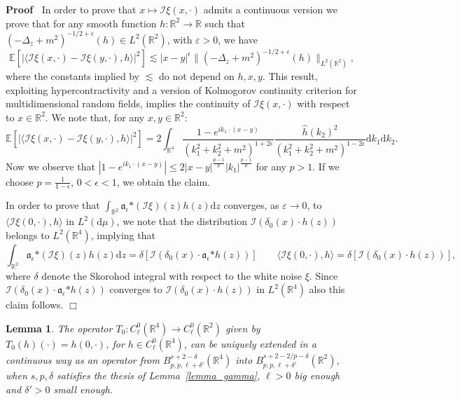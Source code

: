 \documentclass[a4paper,10pt]{article}
\newcommand{\asterisk}{\mathord{*}}
\newcommand{\mathd}{\mathrm{d}}
\newenvironment{proof}{\noindent\textbf{Proof\ }}{\hspace*{\fill}$\Box$\medskip}
\newtheorem{lemma}[theorem]{Lemma}
\begin{document}
\begin{proof}
  In order to prove that $x \longmapsto \mathcal{I} \xi (x, \cdot)$ admits a
  continuous version we prove that for any smooth function $h : \mathbb{R}^2
  \rightarrow \mathbb{R}$ such that $(- \Delta_z + m^2)^{- 1 / 2 + \epsilon}
  (h) \in L^2 (\mathbb{R}^2)$, with $\varepsilon > 0$, we have
  \[ \mathbb{E} [| \langle \mathcal{I} \xi (x, \cdot) - \mathcal{I} \xi (y,
     \cdot), h \rangle |^2] \lesssim | x - y |^{\epsilon} \| (- \Delta_z +
     m^2)^{- 1 / 2 + \epsilon} (h) \|_{L^2 (\mathbb{R}^2)}, \]
  where the constants implied by $\lesssim$ do not depend on $h, x, y$. This
  result, exploiting hypercontractivity and a version of Kolmogorov continuity
  criterion for multidimensional random fields, implies the continuity of
  $\mathcal{I} \xi (x, \cdot)$ with respect to $x \in \mathbb{R}^2$. We note
  that, for any $x, y \in \mathbb{R}^2$:
  \[ \mathbb{E} [| \langle \mathcal{I} \xi (x, \cdot) - \mathcal{I} \xi (y,
     \cdot), h \rangle |^2] = 2 \int_{\mathbb{R}^4} \frac{1 - e^{i k_1 \cdot
     (x - y)}}{(k_1^2 + k_2^2 + m^2)^{1 + 2 \epsilon}} \frac{\hat{h}
     (k_2)^2}{(k_1^2 + k_2^2 + m^2)^{1 - 2 \epsilon}} \mathd k_1 \mathd k_2 .
  \]
  Now we observe that $| 1 - e^{i k_1 \cdot (x - y)} | \leqslant 2 | x - y
  |^{\frac{p - 1}{p}} | k_1 |^{\frac{p - 1}{p}}$ for any $p > 1$. If we choose
  $p = \frac{1}{1 - \epsilon}$, $0 < \epsilon < 1$, we obtain the claim.
  
  In order to prove that $\int_{\mathbb{R}^2} \mathfrak{a}_{\epsilon}
  \asterisk (\mathcal{I} \xi) (z) h (z) \mathd z$ converges, as $\varepsilon
  \rightarrow 0$, to $\langle \mathcal{I} \xi (0, \cdot), h \rangle$ in $L^2
  (\mathd \mu)$, we note that the distribution $\mathcal{I} (\delta_0 (x)
  \cdot h (z))$ belongs to $L^2 (\mathbb{R}^4)$, implying that
  \[ \int_{\mathbb{R}^2} \mathfrak{a}_{\epsilon} \asterisk (\mathcal{I} \xi)
     (z) h (z) \mathd z = \delta [\mathcal{I} (\delta_0 (x) \cdot
     \mathfrak{a}_{\epsilon} \asterisk h (z))] \qquad \langle \mathcal{I} \xi
     (0, \cdot), h \rangle = \delta [\mathcal{I} (\delta_0 (x) \cdot h (z))],
  \]
  where $\delta$ denote the Skorohod integral with respect to the white noise
  $\xi$. Since $\mathcal{I} (\delta_0 (x) \cdot \mathfrak{a}_{\epsilon}
  \asterisk h (z))$ converges to $\mathcal{I} (\delta_0 (x) \cdot h (z))$ in
  $L^2 (\mathbb{R}^4)$ also this claim follows. 
\end{proof}

\begin{lemma}
  \label{lemma_trace}The operator $T_0 : C^0_{\ell} (\mathbb{R}^4) \rightarrow
  C^0_{\ell} (\mathbb{R}^2)$ given by $T_0 (h) (\cdot) = h (0, \cdot)$, for $h
  \in C^0_{\ell} (\mathbb{R}^4)$, can be uniquely extended in a continuous way
  as an operator from $B^{s + 2 - \delta}_{p, p, \ell + \delta'}
  (\mathbb{R}^4)$ into $B^{s + 2 - 2 / p - \delta}_{p, p, \ell + \delta'}
  (\mathbb{R}^2)$, when $s, p, \delta$ satisfies the thesis of
  Lemma~\ref{lemma_gamma}, $\ell > 0$ big enough and $\delta' > 0$ small
  enough.
\end{lemma}
\end{document}
